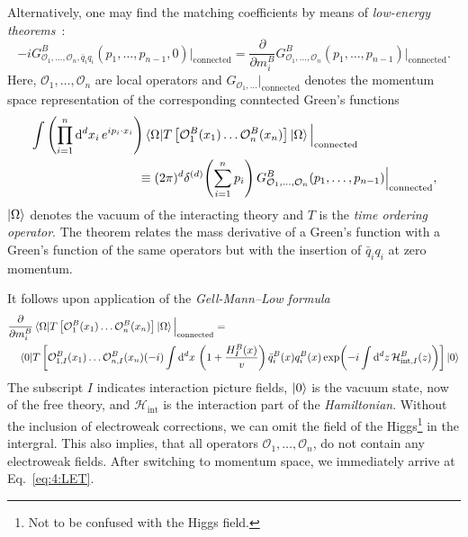Alternatively, one may find the matching coefficients by means of \textit{low-energy theorems}~\cite{Kniehl:1994ju, Kniehl:1995tn, Chetyrkin:1997un}:
\begin{equation}
-i G_{\mathcal{O}_1,\dots,\mathcal{O}_n, \bar{q}_i q_i}^B(p_1, \ldots, p_{n - 1}, 0)\Big \vert_\text{connected} = \frac{\partial}{\partial m_i^B} G_{\mathcal{O}_1,\dots , \mathcal{O}_n}^B (p_1, \ldots, p_{n - 1})\Big \vert_\text{connected}.
\label{eq:4:LET}
\end{equation}
Here, $\mathcal{O}_1, \ldots , \mathcal{O}_n$ are local operators and $G_{\mathcal{O}_1,\dots} \big \vert_\text{connected}$ denotes the momentum space representation of the corresponding conntected Green's functions
\begin{equation}
\begin{split}
& \int \left(\prod_{i = 1}^n \dd^d x_i \, e^{i p_i\cdot x_i} \right) \braket{\Omega | T \left[ \mathcal{O}_1^B(x_1) \dots \mathcal{O}_n^B(x_n) \right] | \Omega} \Big \vert_\text{connected} \\
& \hspace{3cm} \equiv (2 \pi)^d \delta^{(d)}\! \left(\sum_{i = 1}^n p_i \right) G_{\mathcal{O}_1,\dots, \mathcal{O}_n}^B(p_1, \ldots , p_{n - 1}) \Big \vert_\text{connected},
\end{split}
\end{equation}
$\ket{\Omega}$ denotes the vacuum of the interacting theory and $T$ is the \textit{time ordering operator}. The theorem relates the mass derivative of a Green's function with a Green's function of the same operators but with the insertion of $\bar{q}_i q_i$ at zero momentum.

It follows upon application of the \textit{Gell-Mann--Low formula}
\begin{equation}
\begin{split}
&\frac{\partial}{\partial m_i^B} \braket{\Omega | T \left[ \mathcal{O}_1^B(x_1) \dots \mathcal{O}_n^B(x_n) \right] | \Omega} \Big \vert_\text{connected} =  \\
&\quad \braket{0 | T \left[ \mathcal{O}_{1,I}^B(x_1) \dots \mathcal{O}_{n,I}^B(x_n) (-i) \int \mathrm{d}^d x\, \left( 1 + \frac{H_I^B(x)}{v} \right) \bar{q}_{i}^B(x) q_i^B(x) \exp\!\left(-i \int \mathrm{d}^d z \, \mathcal{H}_{\text{int}, I}^B(z) \right) \right] | 0}
\end{split}
\label{eq:4:Gell-Mann-Low}
\end{equation}
The subscript $I$ indicates interaction picture fields, $\ket{0}$ is the vacuum state, now of the free theory, and $\mathcal{H}_{\text{int}}$ is the interaction part of the \textit{Hamiltonian}.
Without the inclusion of electroweak corrections, we can omit the field of the Higgs\footnote{Not to be confused with the Higgs field.} in the intergral. This also implies, that all operators $\mathcal{O}_1, \ldots , \mathcal{O}_n$, do not contain any electroweak fields.
After switching to momentum space, we immediately arrive at Eq.~\eqref{eq:4:LET}.

